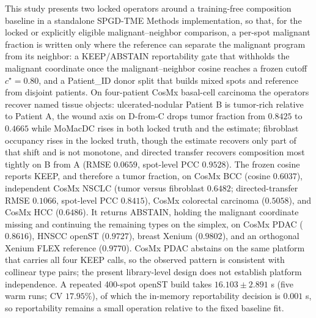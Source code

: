 This study presents two locked operators around a training-free composition baseline in a standalone SPGD-TME Methods implementation, so that, for the locked or explicitly eligible malignant--neighbor comparison, a per-spot malignant fraction is written only where the reference can separate the malignant program from its neighbor: a KEEP/ABSTAIN reportability gate that withholds the malignant coordinate once the malignant--neighbor cosine reaches a frozen cutoff \(c^\star=0.80\), and a Patient\_ID donor split that builds mixed spots and reference from disjoint patients. On four-patient CosMx basal-cell carcinoma the operators recover named tissue objects: ulcerated-nodular Patient B is tumor-rich relative to Patient A, the wound axis on D-from-C drops tumor fraction from \(0.8425\) to \(0.4665\) while MoMacDC rises in both locked truth and the estimate; fibroblast occupancy rises in the locked truth, though the estimate recovers only part of that shift and is not monotone, and directed transfer recovers composition most tightly on B from A (RMSE \(0.0659\), spot-level PCC \(0.9528\)). The frozen cosine reports KEEP, and therefore a tumor fraction, on CosMx BCC (cosine \(0.6037\)), independent CosMx NSCLC (tumor versus fibroblast \(0.6482\); directed-transfer RMSE \(0.1066\), spot-level PCC \(0.8415\)), CosMx colorectal carcinoma (\(0.5058\)), and CosMx HCC (\(0.6486\)). It returns ABSTAIN, holding the malignant coordinate missing and continuing the remaining types on the simplex, on CosMx PDAC (\(0.8616\)), HNSCC openST (\(0.9727\)), breast Xenium (\(0.9802\)), and an orthogonal Xenium FLEX reference (\(0.9770\)). CosMx PDAC abstains on the same platform that carries all four KEEP calls, so the observed pattern is consistent with collinear type pairs; the present library-level design does not establish platform independence. A repeated 400-spot openST build takes \(16.103\pm2.891\) s (five warm runs; CV \(17.95\%\)), of which the in-memory reportability decision is \(0.001\) s, so reportability remains a small operation relative to the fixed baseline fit.
